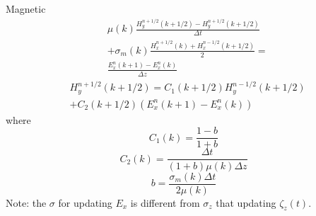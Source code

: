 \documentclass[a4paper,10pt]{article}
\begin{document}
Magnetic
\begin{equation}
\begin{aligned}
&\mu(k)\frac{H^{n+1/2}_{y}(k+1/2)-H^{n+1/2}_{y}(k+1/2)}{\Delta t}\\
&+\sigma_m(k)\frac{H^{n+1/2}_{x}(k)+H^{n-1/2}_{x}(k+1/2)}{2}=\\
&\frac{E^{n}_{x}(k+1)-E^{n}_{x}(k)}{\Delta z}
\end{aligned}
\end{equation}
\begin{equation}
\begin{aligned}
&H^{n+1/2}_{y}(k+1/2)=C_{1}(k+1/2)H^{n-1/2}_{y}(k+1/2)\\
&+C_{2}(k+1/2)\left(E^{n}_{x}(k+1)-E^{n}_{x}(k)\right)
\end{aligned}
\end{equation}
where 
\begin{equation}
C_{1}(k)=\frac{1-b}{1+b}
\end{equation}
\begin{equation}
C_{2}(k)=\frac{\Delta t}{(1+b)\mu(k)\Delta z}
\end{equation}
\begin{equation}
b=\frac{\sigma_m(k)\Delta t}{2\mu(k)}
\end{equation}
Note:
the $\sigma$ for updating $E_{x}$ is different from $\sigma_{z}$ that updating $\zeta_{z}(t)$.
\end{document}
